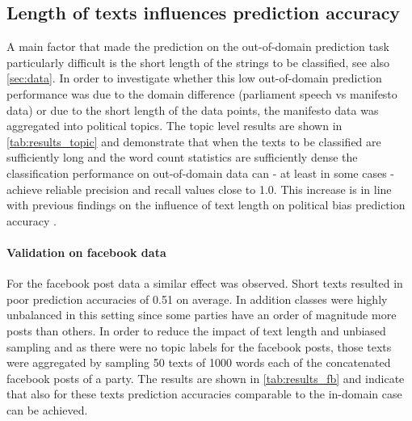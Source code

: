 \documentclass[11pt]{article}
\begin{document}
\subsection{Length of texts influences prediction accuracy}
A main factor that made the prediction on the out-of-domain prediction task particularly difficult is the short length of the strings to be classified, see also \autoref{sec:data}. In order to investigate whether this low out-of-domain prediction performance was due to the domain difference (parliament speech vs manifesto data) or due to the short length of the data points, the manifesto data was aggregated into political topics. The topic level results are shown in \autoref{tab:results_topic} and demonstrate that when the texts to be classified are sufficiently long and the word count statistics are sufficiently dense the classification performance on out-of-domain data can - at least in some cases - achieve reliable precision and recall values close to 1.0. This increase is in line with previous findings on the influence of text length on political bias prediction accuracy \cite{Hirst2014}. 

\paragraph{Validation on facebook data}
For the facebook post data a similar effect was observed. Short texts resulted in poor prediction accuracies of 0.51 on average. In addition classes were highly unbalanced in this setting since some parties have an order of magnitude more posts than others. In order to reduce the impact of text length and unbiased sampling and as there were no topic labels for the facebook posts, those texts were aggregated by sampling 50 texts of 1000 words each of the concatenated facebook posts of a party. The results are shown in \autoref{tab:results_fb} and indicate that also for these texts prediction accuracies comparable to the in-domain case can be achieved. 
\end{document}
